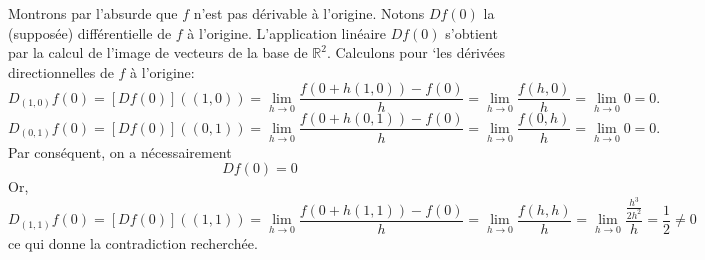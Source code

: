 {{Montrons par l'absurde que $f$ n'est pas d\'erivable \`a
l'origine. Notons $Df(0)$ la (suppos\'ee) diff\'erentielle de $f$
\`a l'origine. L'application lin\'eaire $Df(0)$ s'obtient par la
calcul de l'image de vecteurs de la base de $\mathbb{R}^2$.
Calculons pour `les d\'eriv\'ees directionnelles de $f$ \`a
l'origine: $$D_{(1,0)}f(0)=[Df(0)]((1,0))= \lim_{h \rightarrow 0}
\frac{f(0+h(1,0))-f(0)}{h}=\lim_{h \rightarrow 0}
\frac{f(h,0)}{h}=\lim_{h \rightarrow 0} 0=0.$$
$$D_{(0,1)}f(0)=[Df(0)]((0,1))= \lim_{h \rightarrow 0}
\frac{f(0+h(0,1))-f(0)}{h}=\lim_{h \rightarrow 0}
\frac{f(0,h)}{h}=\lim_{h \rightarrow 0} 0=0.$$ Par cons\'equent,
on a n\'ecessairement $$Df(0)=0$$
Or,$$D_{(1,1)}f(0)=[Df(0)]((1,1))= \lim_{h \rightarrow 0}
\frac{f(0+h(1,1))-f(0)}{h}=\lim_{h \rightarrow 0}
\frac{f(h,h)}{h}=\lim_{h \rightarrow 0}
\frac{\frac{h^3}{2h^2}}{h}=\frac{1}{2} \neq 0$$ ce qui donne la
contradiction recherch\'ee.
}
}
